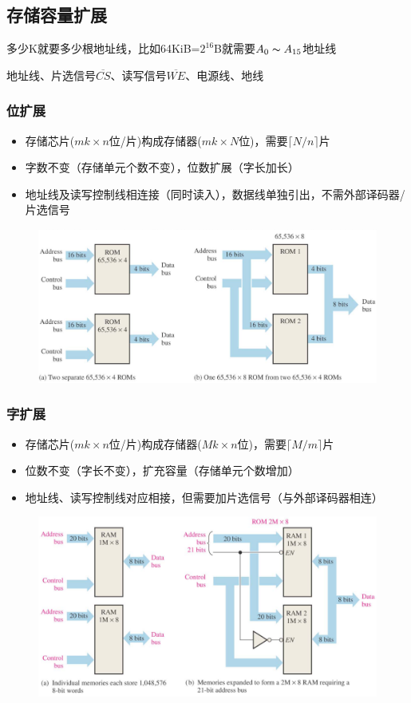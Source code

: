 \subsection{存储容量扩展}
多少K就要多少根地址线，比如64KiB=$2^16$B就需要$A_0\thicksim A_{15}$地址线
\par 地址线、片选信号$\overline{CS}$、读写信号$\overline{WE}$、电源线、地线
\subsubsection{位扩展}
\begin{itemize}
	\item 存储芯片($mk\times n$位/片)构成存储器($mk\times N$位)，需要$\lceil N/n\rceil$片
	\item 字数不变（存储单元个数不变），位数扩展（字长加长）
	\item 地址线及读写控制线相连接（同时读入），数据线单独引出，不需外部译码器/片选信号
\end{itemize}
\begin{figure}[H]
\centering
\includegraphics[width=0.6\linewidth]{fig/word-length.PNG}
\end{figure}

\subsubsection{字扩展}
\begin{itemize}
	\item 存储芯片($mk\times n$位/片)构成存储器($Mk\times n$位)，需要$\lceil M/m\rceil$片
	\item 位数不变（字长不变），扩充容量（存储单元个数增加）
	\item 地址线、读写控制线对应相接，但需要加片选信号（与外部译码器相连）
\end{itemize}
\begin{figure}[H]
\centering
\includegraphics[width=0.6\linewidth]{fig/word-capacity.PNG}
\end{figure}

